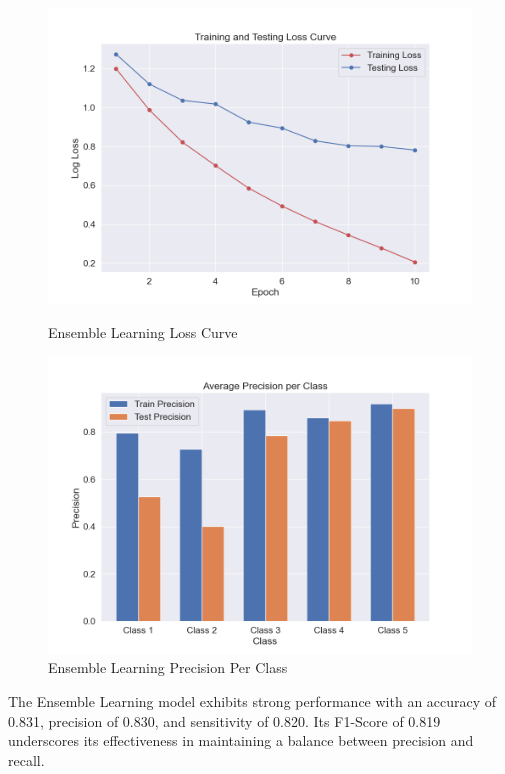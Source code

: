 \begin{figure}[H]
	\vspace{1em}
	
	\begin{minipage}[t]{0.48\textwidth}
		\centering
		\includegraphics[width=\textwidth]{img/paper_1/loss_curve.png}
		\caption{Ensemble Learning Loss Curve}
	\end{minipage}
	\hfill
	\begin{minipage}[t]{0.48\textwidth}
		\centering
		\includegraphics[width=\textwidth]{img/paper_1/precision_per_class.png}
		\caption{Ensemble Learning Precision Per Class}
	\end{minipage}
\end{figure}

The Ensemble Learning model exhibits strong performance with an accuracy of 0.831, precision of 0.830, and sensitivity of 0.820. Its F1-Score of 0.819 underscores its effectiveness in maintaining a balance between precision and recall.



